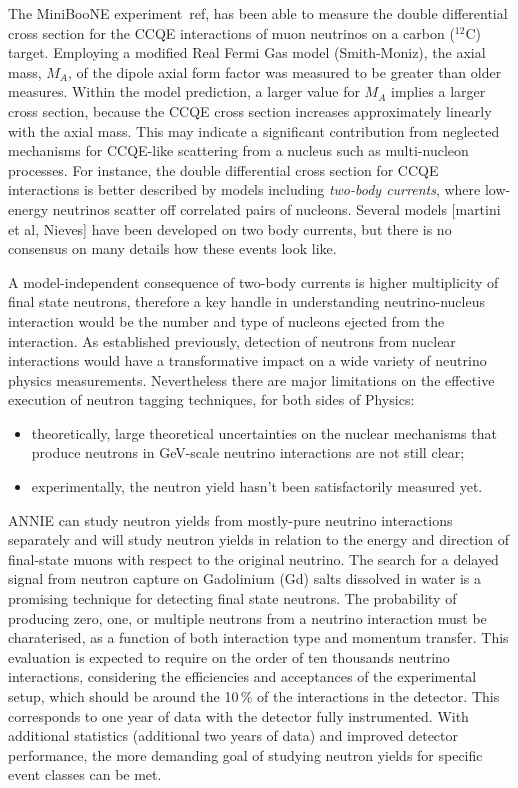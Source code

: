  The MiniBooNE experiment~ref, has been able to measure the double differential cross section for the %
 CCQE interactions of muon neutrinos on a carbon ($^{12}$C) target.
 Employing a modified Real Fermi Gas model (Smith-Moniz), the axial mass, $M_A$, of the dipole axial form factor %
 was measured to be greater than older measures.
 Within the model prediction, a larger value for $M_A$ implies a larger cross section, because the CCQE cross section %
 increases approximately linearly with the axial mass.
 This may indicate a significant contribution from neglected mechanisms for CCQE-like scattering %
 from a nucleus such as multi-nucleon processes.
 For instance, the double differential cross section for CCQE interactions is better described by models %
 including \emph{two-body currents}, where low-energy neutrinos scatter off correlated pairs of nucleons.
 Several models [martini et al, Nieves] have been developed on two body currents, %
 but there is no consensus on many details how these events look like.

 A model-independent consequence of two-body currents is higher multiplicity of final state neutrons, therefore %
 a key handle in understanding neutrino-nucleus interaction would be the number and type of nucleons %
 ejected from the interaction.
 As established previously, detection of neutrons from nuclear interactions %
 would have a transformative impact on a wide variety of neutrino physics measurements.
 Nevertheless there are major limitations on the effective execution of neutron tagging %
 techniques, for both sides of Physics:
 \begin{itemize}
   \item theoretically, large theoretical uncertainties on the nuclear mechanisms that %
     produce neutrons in GeV-scale neutrino interactions are not still clear;
   \item experimentally, the neutron yield hasn't been satisfactorily measured yet.
 \end{itemize}

 ANNIE can study neutron yields from mostly-pure neutrino interactions separately %
 and will study neutron yields in relation to the energy and direction of final-state muons
 with respect to the original neutrino. 
 The search for a delayed signal from neutron capture on Gadolinium (Gd) salts dissolved in water %
 is a promising technique for detecting final state neutrons.
 The probability of producing zero, one, or multiple neutrons from a neutrino interaction must be charaterised, %
 as a function of both interaction type and momentum transfer.
 This evaluation is expected to require on the order of ten thousands neutrino interactions, considering %
 the efficiencies and acceptances of the experimental setup, which should be around the 10\,\% of the interactions %
 in the detector. 
 This corresponds to one year of data with the detector fully instrumented.
 With additional statistics (additional two years of data) and improved detector performance, %
 the more demanding goal of studying neutron yields for specific event classes can be met.

